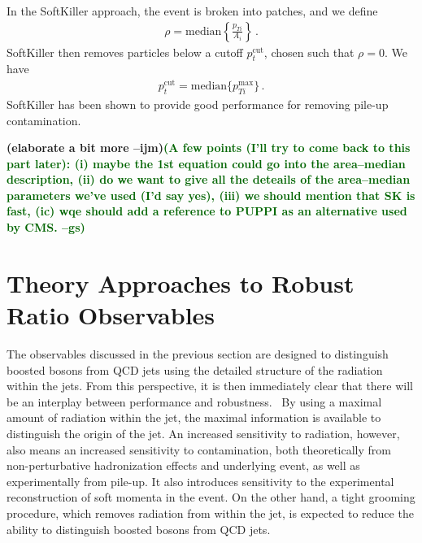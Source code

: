 \documentclass[11pt,letterpaper]{article}
\newcommand{\ijm}[1]{\textbf{\textcolor{llblue}{(#1 --ijm)}}}
\newcommand{\gs}[1]{\textbf{\textcolor{darkgreen}{(#1 --gs)}}}
\begin{document}
In the SoftKiller approach, the event is broken into patches, and we define
\begin{align}
\rho= \text{median} \left \{ \frac{p_{Ti}}{A_i}   \right \}\,.
\end{align}
SoftKiller then removes particles below a cutoff $p_t^{\text{cut}}$, chosen such that $\rho=0$. We have
\begin{align}
p_t^{\text{cut}}=\text{median} \{ p_{Ti}^{\text{max}} \}\,.
\end{align}
SoftKiller has been shown to provide good performance for removing pile-up contamination.

\ijm{elaborate a bit more}\gs{A few points (I'll try to come back to
  this part later): (i) maybe the 1st equation could go into the
  area--median description, (ii) do we want to give all the deteails
  of the area--median parameters we've used (I'd say yes), (iii) we
  should mention that SK is fast, (ic) wqe should add a reference to
  PUPPI as an alternative used by CMS.}

\section{Theory Approaches to Robust Ratio Observables}\label{sec:hybrid_ratio}

The observables discussed in the previous section are designed to
distinguish boosted bosons from QCD jets using the detailed structure
of the radiation within the jets.
%
From this perspective, it is then
immediately clear that there will be an interplay between performance
and robustness.\
%
By using a maximal amount of radiation within the jet,
the maximal information is available to distinguish the origin of the
jet.
%
An increased sensitivity to radiation, however, also means an
increased sensitivity to contamination, both theoretically from
non-perturbative hadronization effects and underlying event, as well
as experimentally from pile-up.
%
It also introduces sensitivity to the
experimental reconstruction of soft momenta in the event.
%
On the other
hand, a tight grooming procedure, which removes radiation from within
the jet, is expected to reduce the ability to distinguish boosted
bosons from QCD jets.
\end{document}
